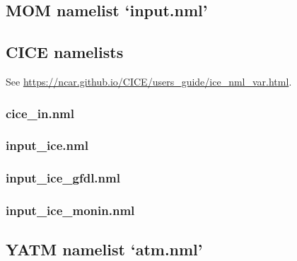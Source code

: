 \documentclass[11pt]{article}
\makeatletter
\newcommand*{\make@hex@label}[1]{%
  \def\hex@label{#1}%
  \@onelevel@sanitize\hex@label
  \EdefEscapeHex\hex@label{\hex@label}%
}
\newcommand*{\hexhypertarget}[2]{%
  \@bsphack
    \make@hex@label{#1}%
    \hypertarget{\hex@label}{#2}%
  \@esphack
}
\newcommand{\paramsty}[1]{\textsf{#1}}
\newcommand{\nmllink}[2]{#1\index{\paramsty{#1}}} %
\newcommand{\nml}[1]{{\footnotesize\textsf{}}}
\makeatother
\begin{document}
\subsection{MOM namelist `input.nml'}\label{S:mom-namelist}
\renewcommand{\nmllink}[2]{\hexhypertarget{mom:#2}{\href{https://github.com/mom-ocean/MOM5/search?q=#2}{#1}}\index{\paramsty{#1}}} %
\nml{input_nml.tex}

\subsection{CICE namelists}\label{S:cice-namelist}
See \url{https://ncar.github.io/CICE/users_guide/ice_nml_var.html}.
\renewcommand{\nmllink}[2]{\hexhypertarget{cice:#2}{\href{https://github.com/OceansAus/cice5/search?q=#2}{#1}}\index{\paramsty{#1}}} %
\subsubsection{cice\_in.nml}
\nml{cice_in_nml.tex}
\subsubsection{input\_ice.nml}
\nml{input_ice_nml.tex}
\subsubsection{input\_ice\_gfdl.nml}
\nml{input_ice_gfdl_nml.tex}
\subsubsection{input\_ice\_monin.nml}
\nml{input_ice_monin_nml.tex}

\subsection{YATM namelist `atm.nml'}\label{S:yatm-namelist}
\renewcommand{\nmllink}[2]{\hexhypertarget{yatm:#2}{\href{https://github.com/OceansAus/libaccessom2/search?q=#2}{#1}}\index{\paramsty{#1}}} %
\nml{atm_nml.tex}
\end{document}
